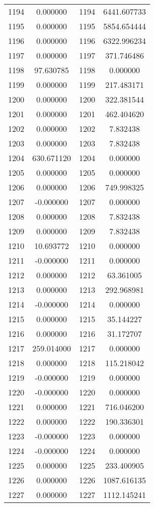 \documentclass[12pt]{article}
\begin{document}
\begin{longtable}{@{}cccc@{}}
1194 & 0.000000 & 1194 & 6441.607733 \\
1195 & 0.000000 & 1195 & 5854.654444 \\
1196 & 0.000000 & 1196 & 6322.996234 \\
1197 & 0.000000 & 1197 & 371.746486 \\
1198 & 97.630785 & 1198 & 0.000000 \\
1199 & 0.000000 & 1199 & 217.483171 \\
1200 & 0.000000 & 1200 & 322.381544 \\
1201 & 0.000000 & 1201 & 462.404620 \\
1202 & 0.000000 & 1202 & 7.832438 \\
1203 & 0.000000 & 1203 & 7.832438 \\
1204 & 630.671120 & 1204 & 0.000000 \\
1205 & 0.000000 & 1205 & 0.000000 \\
1206 & 0.000000 & 1206 & 749.998325 \\
1207 & -0.000000 & 1207 & 0.000000 \\
1208 & 0.000000 & 1208 & 7.832438 \\
1209 & 0.000000 & 1209 & 7.832438 \\
1210 & 10.693772 & 1210 & 0.000000 \\
1211 & -0.000000 & 1211 & 0.000000 \\
1212 & 0.000000 & 1212 & 63.361005 \\
1213 & 0.000000 & 1213 & 292.968981 \\
1214 & -0.000000 & 1214 & 0.000000 \\
1215 & 0.000000 & 1215 & 35.144227 \\
1216 & 0.000000 & 1216 & 31.172707 \\
1217 & 259.014000 & 1217 & 0.000000 \\
1218 & 0.000000 & 1218 & 115.218042 \\
1219 & -0.000000 & 1219 & 0.000000 \\
1220 & -0.000000 & 1220 & 0.000000 \\
1221 & 0.000000 & 1221 & 716.046200 \\
1222 & 0.000000 & 1222 & 190.336301 \\
1223 & -0.000000 & 1223 & 0.000000 \\
1224 & -0.000000 & 1224 & 0.000000 \\
1225 & 0.000000 & 1225 & 233.400905 \\
1226 & 0.000000 & 1226 & 1087.616135 \\
1227 & 0.000000 & 1227 & 1112.145241 \\

\end{longtable}
\end{document}
